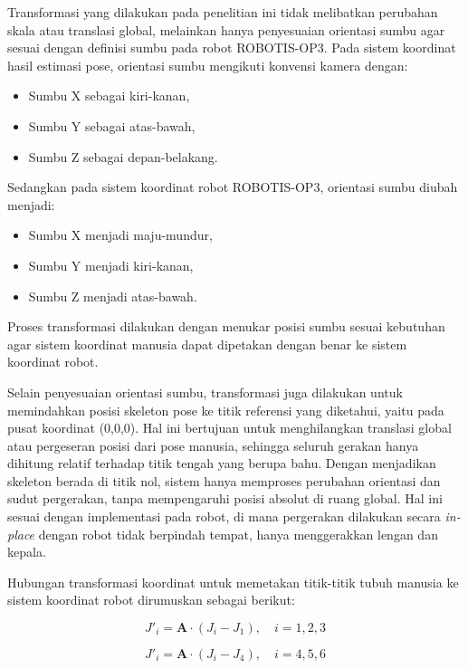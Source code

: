 Transformasi yang dilakukan pada penelitian ini tidak melibatkan perubahan skala atau translasi global, melainkan hanya penyesuaian orientasi sumbu agar sesuai dengan definisi sumbu pada robot ROBOTIS-OP3. Pada sistem koordinat hasil estimasi pose, orientasi sumbu mengikuti konvensi kamera dengan:

\begin{itemize}
    \item Sumbu X sebagai kiri-kanan,
    \item Sumbu Y sebagai atas-bawah,
    \item Sumbu Z sebagai depan-belakang.
\end{itemize}

Sedangkan pada sistem koordinat robot ROBOTIS-OP3, orientasi sumbu diubah menjadi:

\begin{itemize}
    \item Sumbu X menjadi maju-mundur,
    \item Sumbu Y menjadi kiri-kanan,
    \item Sumbu Z menjadi atas-bawah.
\end{itemize}

Proses transformasi dilakukan dengan menukar posisi sumbu sesuai kebutuhan agar sistem koordinat manusia dapat dipetakan dengan benar ke sistem koordinat robot.

Selain penyesuaian orientasi sumbu, transformasi juga dilakukan untuk memindahkan posisi skeleton pose ke titik referensi yang diketahui, yaitu pada pusat koordinat (0,0,0). Hal ini bertujuan untuk menghilangkan translasi global atau pergeseran posisi dari pose manusia, sehingga seluruh gerakan hanya dihitung relatif terhadap titik tengah yang berupa bahu. Dengan menjadikan skeleton berada di titik nol, sistem hanya memproses perubahan orientasi dan sudut pergerakan, tanpa mempengaruhi posisi absolut di ruang global. Hal ini sesuai dengan implementasi pada robot, di mana pergerakan dilakukan secara \textit{in-place} dengan robot tidak berpindah tempat, hanya menggerakkan lengan dan kepala.


Hubungan transformasi koordinat untuk memetakan titik-titik tubuh manusia ke sistem koordinat robot dirumuskan sebagai berikut:

\begin{equation}
J'_{i} = \mathbf{A} \cdot (J_{i} - J_{1}), \quad i = 1,2,3
\end{equation}

\begin{equation}
J'_{i} = \mathbf{A} \cdot (J_{i} - J_{4}), \quad i = 4,5,6
\end{equation}

